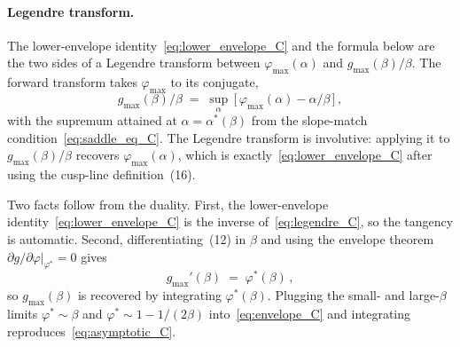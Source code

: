 \documentclass[letterpaper]{article} %
\newcommand{\Bnet}{\beta}
\newcommand{\p}{\partial}
\begin{document}
\paragraph{Legendre transform.}
The lower-envelope identity~\eqref{eq:lower_envelope_C} and the formula
below are the two sides of a Legendre transform between
$\varphi_{\max}(\alpha)$ and $g_{\max}(\Bnet)/\Bnet$.  The forward
transform takes $\varphi_{\max}$ to its conjugate,
\begin{equation}
g_{\max}(\Bnet)/\Bnet \;=\; \sup_\alpha\,\bigl[\,\varphi_{\max}(\alpha) - \alpha/\Bnet\,\bigr]\,,
\tag{52}
\label{eq:legendre_C}
\end{equation}
with the supremum attained at $\alpha = \alpha^*(\Bnet)$ from the
slope-match condition~\eqref{eq:saddle_eq_C}.  The Legendre transform
is involutive: applying it to $g_{\max}(\Bnet)/\Bnet$ recovers
$\varphi_{\max}(\alpha)$, which is exactly~\eqref{eq:lower_envelope_C}
after using the cusp-line definition~(16).

Two facts follow from the duality.  First, the lower-envelope
identity~\eqref{eq:lower_envelope_C} is the inverse
of~\eqref{eq:legendre_C}, so the tangency is automatic.  Second,
differentiating~(12) in $\Bnet$ and using the
envelope theorem $\p g/\p\varphi|_{\varphi^*} = 0$ gives
\begin{equation}
g_{\max}'(\Bnet) \;=\; \varphi^*(\Bnet)\,,
\tag{53}
\label{eq:envelope_C}
\end{equation}
so $g_{\max}(\Bnet)$ is recovered by integrating $\varphi^*(\Bnet)$.
Plugging the small- and large-$\Bnet$ limits $\varphi^* \sim \Bnet$
and $\varphi^* \sim 1 - 1/(2\Bnet)$ into~\eqref{eq:envelope_C} and
integrating reproduces~\eqref{eq:asymptotic_C}.


\end{document}
